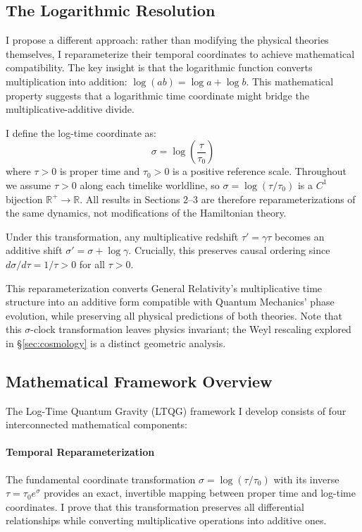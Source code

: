 \subsection{The Logarithmic Resolution}

I propose a different approach: rather than modifying the physical theories themselves, I reparameterize their temporal coordinates to achieve mathematical compatibility. The key insight is that the logarithmic function converts multiplication into addition: $\log(ab) = \log a + \log b$. This mathematical property suggests that a logarithmic time coordinate might bridge the multiplicative-additive divide.

I define the log-time coordinate as:
\begin{equation}
\sigma = \log\left(\frac{\tau}{\tau_0}\right)
\end{equation}
where $\tau > 0$ is proper time and $\tau_0 > 0$ is a positive reference scale. Throughout we assume $\tau > 0$ along each timelike worldline, so $\sigma = \log(\tau/\tau_0)$ is a $C^1$ bijection $\mathbb{R}^+ \to \mathbb{R}$. All results in Sections 2–3 are therefore reparameterizations of the same dynamics, not modifications of the Hamiltonian theory.

Under this transformation, any multiplicative redshift $\tau' = \gamma \tau$ becomes an additive shift $\sigma' = \sigma + \log \gamma$. Crucially, this preserves causal ordering since $d\sigma/d\tau = 1/\tau > 0$ for all $\tau > 0$.

This reparameterization converts General Relativity's multiplicative time structure into an additive form compatible with Quantum Mechanics' phase evolution, while preserving all physical predictions of both theories. Note that this $\sigma$-clock transformation leaves physics invariant; the Weyl rescaling explored in §\ref{sec:cosmology} is a distinct geometric analysis.

\subsection{Mathematical Framework Overview}

The Log-Time Quantum Gravity (LTQG) framework I develop consists of four interconnected mathematical components:

\paragraph{Temporal Reparameterization} The fundamental coordinate transformation $\sigma = \log(\tau/\tau_0)$ with its inverse $\tau = \tau_0 e^\sigma$ provides an exact, invertible mapping between proper time and log-time coordinates. I prove that this transformation preserves all differential relationships while converting multiplicative operations into additive ones.


